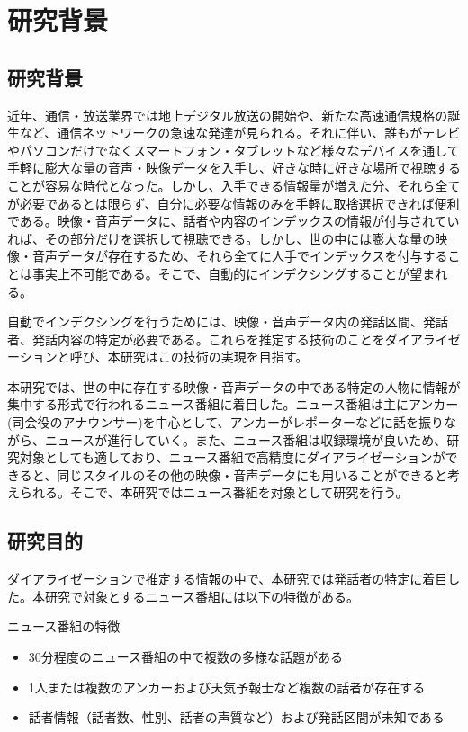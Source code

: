\chapter{研究背景}

\section{研究背景}
近年、通信・放送業界では地上デジタル放送の開始や、新たな高速通信規格の誕生など、通信ネットワークの急速な発達が見られる。それに伴い、誰もがテレビやパソコンだけでなくスマートフォン・タブレットなど様々なデバイスを通して手軽に膨大な量の音声・映像データを入手し、好きな時に好きな場所で視聴することが容易な時代となった。しかし、入手できる情報量が増えた分、それら全てが必要であるとは限らず、自分に必要な情報のみを手軽に取捨選択できれば便利である。映像・音声データに、話者や内容のインデックスの情報が付与されていれば、その部分だけを選択して視聴できる。しかし、世の中には膨大な量の映像・音声データが存在するため、それら全てに人手でインデックスを付与することは事実上不可能である。そこで、自動的にインデクシングすることが望まれる。\par
自動でインデクシングを行うためには、映像・音声データ内の発話区間、発話者、発話内容の特定が必要である。これらを推定する技術のことをダイアライゼーションと呼び、本研究はこの技術の実現を目指す。\par
本研究では、世の中に存在する映像・音声データの中である特定の人物に情報が集中する形式で行われるニュース番組に着目した。ニュース番組は主にアンカー(司会役のアナウンサー)を中心として、アンカーがレポーターなどに話を振りながら、ニュースが進行していく。また、ニュース番組は収録環境が良いため、研究対象としても適しており、ニュース番組で高精度にダイアライゼーションができると、同じスタイルのその他の映像・音声データにも用いることができると考えられる。そこで、本研究ではニュース番組を対象として研究を行う。

\section{研究目的}
ダイアライゼーションで推定する情報の中で、本研究では発話者の特定に着目した。本研究で対象とするニュース番組には以下の特徴がある。\newline

ニュース番組の特徴
\begin{itemize}
\item 30分程度のニュース番組の中で複数の多様な話題がある
\item 1人または複数のアンカーおよび天気予報士など複数の話者が存在する
\item 話者情報（話者数、性別、話者の声質など）および発話区間が未知である
\end{itemize}\par\par

